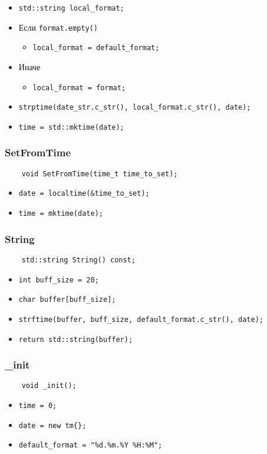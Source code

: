 \begin{itemize}
    \item \verb|std::string local_format;|
    \item Если \verb|format.empty()|
        \begin{itemize}
            \item \verb|local_format = default_format;|
        \end{itemize}    
    \item Иначе
        \begin{itemize}
            \item \verb|local_format = format;|
        \end{itemize} 
    \item \verb|strptime(date_str.c_str(), local_format.c_str(), date);|
    \item \verb|time = std::mktime(date);|
\end{itemize}

\subsubsection{SetFromTime}

\begin{lstlisting}
    void SetFromTime(time_t time_to_set);
\end{lstlisting}

\begin{itemize}
    \item \verb|date = localtime(&time_to_set);|
    \item \verb|time = mktime(date);|
\end{itemize}

\subsubsection{String}

\begin{lstlisting}
    std::string String() const;
\end{lstlisting}

\begin{itemize}
    \item \verb|int buff_size = 20;|
    \item \verb|char buffer[buff_size];|
    \item \verb|strftime(buffer, buff_size, default_format.c_str(), date);|
    \item \verb|return std::string(buffer);|
\end{itemize}

\subsubsection{\_init}

\begin{lstlisting}
    void _init();
\end{lstlisting}

\begin{itemize}
    \item \verb|time = 0;|
    \item \verb|date = new tm{};|
    \item \verb|default_format = "%d.%m.%Y %H:%M";|
\end{itemize}


